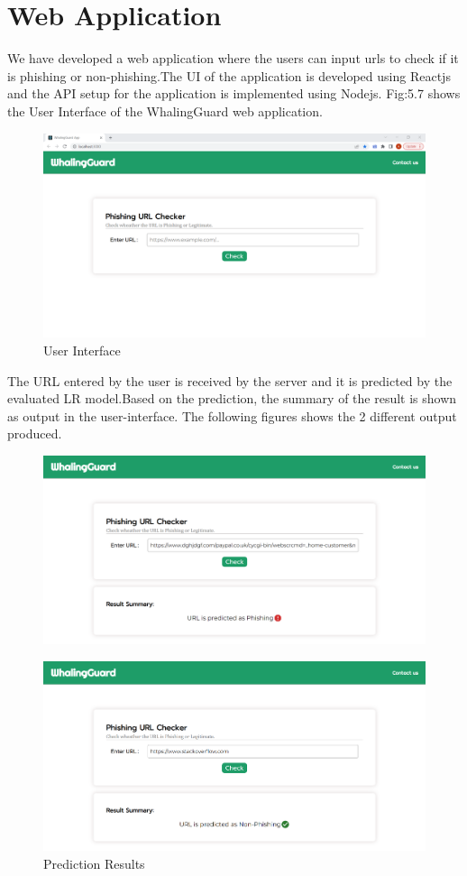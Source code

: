 \section{Web Application}
\par We have developed a web application where the users can input urls to check if it is phishing or non-phishing.The UI of the application is developed using Reactjs and the API setup for the application is implemented using Nodejs. Fig:5.7 shows the User Interface of the WhalingGuard web application.
\begin{figure}[H]
\centerline{\includegraphics[scale=0.35]{ui.png}}
\caption{User Interface}
\label{fig}
\end{figure}
\par The URL entered by the user is received by the server and it is predicted by the evaluated LR model.Based on the prediction, the summary of the result is shown as output in the user-interface. The following figures shows the 2 different output produced.
\begin{figure}[H]
\centerline{\includegraphics[scale=0.35]{uiP.png}}
\end{figure}
\begin{figure}[H]
\centerline{\includegraphics[scale=0.35]{uiN.png}}
\caption{Prediction Results}
\label{fig}
\end{figure}










